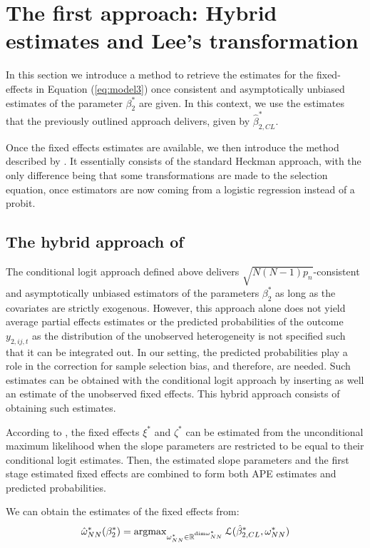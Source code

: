 \section{The first approach: Hybrid estimates and Lee's transformation} \label{first_approach}

In this section we introduce a method to retrieve the estimates for the fixed-effects in Equation (\ref{eq:model3}) once consistent and asymptotically unbiased estimates of the parameter $\beta_2^*$ are given. In this context, we use the estimates that the previously outlined approach delivers, given by $\hat{\beta}_{2,CL}^*$. 

Once the fixed effects estimates are available, we then introduce the method described by \cite{lee1983generalized}. It essentially consists of the standard Heckman approach, with the only difference being that some transformations are made to the selection equation, once estimators are now coming from a logistic regression instead of a probit.

\subsection{The hybrid approach of \cite{martin2018bls}}
The conditional logit approach defined above delivers $\sqrt{N(N-1)p_n}$-consistent and asymptotically unbiased estimators of the parameters $\beta_2^*$ as long as the covariates are strictly exogenous. However, this approach alone does not yield average partial effects estimates or the predicted probabilities of the outcome $y_{2,ij,t}$ as the distribution of the unobserved heterogeneity is not specified such that it can be integrated out. In our setting, the predicted probabilities play a role in the correction for sample selection bias, and therefore, are needed. Such estimates can be obtained with the conditional logit approach by inserting as well an estimate of the unobserved fixed effects. This hybrid approach consists of obtaining such estimates.

According to \cite{martin2018bls}, the fixed effects $\xi^*$ and $\zeta^*$ can be estimated from the unconditional maximum likelihood when the slope parameters are restricted to be equal to their conditional logit estimates. Then, the estimated slope parameters and the first stage estimated fixed effects are combined to form both APE estimates and predicted probabilities.

We can obtain the estimates of the fixed effects from:
\begin{align*}
  \hat{\omega}_{NN}^*(\beta_2^*) = \operatorname{argmax}_{\omega_{NN}^* \in \mathbb{R}^{\text{dim} \omega_{NN}^*}} \mathcal{L} (\hat{\beta}_{2,CL}^*, \omega_{NN}^*)   
\end{align*}

